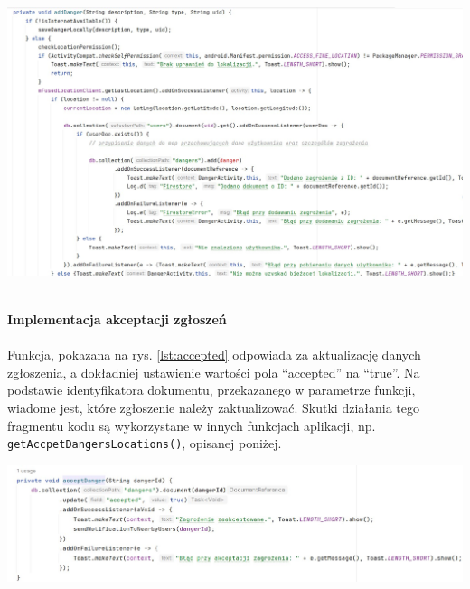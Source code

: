 \noindent
\begin{minipage}{\linewidth}
    \label{lst:danger}
    \centering
    \includegraphics[width=0.8\linewidth]{img/kod/imp-adddanger.jpg}
\end{minipage}
\\

\textbf{Implementacja akceptacji zgłoszeń} \\ 
\\
Funkcja, pokazana na rys. \ref{lst:accepted} odpowiada za aktualizację danych zgłoszenia, a dokładniej ustawienie wartości pola “accepted” na “true”. Na podstawie identyfikatora dokumentu, przekazanego w parametrze funkcji, wiadome jest, które zgłoszenie należy zaktualizować. Skutki działania tego fragmentu kodu są wykorzystane w innych funkcjach aplikacji, np. \verb|getAccpetDangersLocations()|, opisanej poniżej.

\noindent
\begin{minipage}{\linewidth}
    \label{lst:accepted}
    \centering
    \includegraphics[width=0.8\linewidth]{img/kod/imp-acceptdanger.jpg}
\end{minipage}
\\

